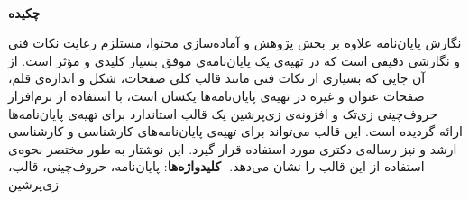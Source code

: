 

‫

\begin{center}
	
	\textbf{چکیده}
\end{center}


‫نگارش پایان‌نامه‌ علاوه بر بخش پژوهش و آماده‌سازی محتوا،
‫مستلزم رعایت نکات فنی و نگارشی دقیقی است 
‫که در تهیه‌ی یک پایان‌نامه‌ی موفق بسیار کلیدی و مؤثر است.
‫از آن جایی که بسیاری از نکات فنی مانند قالب کلی صفحات، شکل و اندازه‌ی قلم، 
‫صفحات عنوان و غیره در تهیه‌ی پایان‌نامه‌ها یکسان است،
‫با استفاده از نرم‌افزار حروف‌چینی زی‌تک %
‫و افزونه‌ی زی‌پرشین %
‫یک قالب استاندارد برای تهیه‌ی پایان‌نامه‌ها ارائه گردیده است.
‫این قالب می‌تواند برای تهیه‌ی پایان‌نامه‌های
‫کارشناسی و کارشناسی ارشد و نیز رساله‌ی دکتری مورد استفاده قرار گیرد.
‫این نوشتار به طور مختصر نحوه‌ی استفاده از این قالب را نشان می‌دهد.
‫
\newline
\textbf{کلیدواژه‌ها}: 
‫پایان‌نامه، حروف‌چینی، قالب، زی‌پرشین
\pagebreak
‫